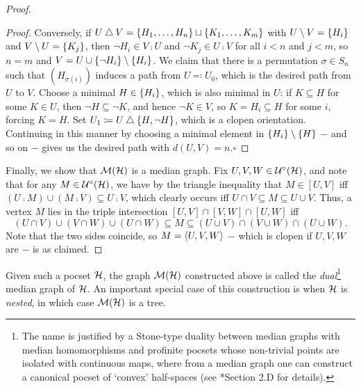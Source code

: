 \documentclass[reqno]{amsart}
\begin{document}
\begin{proof}
\begin{center}
\begin{minipage}{0.95\textwidth}
\begin{proof}
                    \hspace{0.2in}Conversely, if $U\bigtriangleup V=\left\{H_1,\dots,H_n\right\}\sqcup\left\{K_1,\dots,K_m\right\}$ with $U\setminus V=\left\{H_i\right\}$ and $V\setminus U=\left\{K_j\right\}$, then $\lnot H_i\in V\comp U$ and $\lnot K_j\in U\comp V$ for all $i<n$ and $j<m$, so $n=m$ and $V=U\cup\left\{\lnot H_i\right\}\setminus\left\{H_i\right\}$. We claim that there is a permutation $\sigma\in S_n$ such that $(H_{\sigma(i)})$ induces a path from $U\eqqcolon U_0$, which is the desired path from $U$ to $V$. Choose a minimal $H\in\left\{H_i\right\}$, which is also minimal in $U$: if $K\subseteq H$ for some $K\in U$, then $\lnot H\subseteq\lnot K$, and hence $\lnot K\in V$, so $K=H_i\subseteq H$ for some $i$, forcing $K=H$. Set $U_1\coloneqq U\bigtriangleup\left\{H,\lnot H\right\}$, which is a clopen orientation. Continuing in this manner by choosing a minimal element in $\left\{H_i\right\}\setminus\left\{H\right\}$ $-$ and so on $-$ gives us the desired path with $d(U,V)=n$.\phantom\qedhere\hfill$\square$
                \end{proof}
            \end{minipage}
        \end{center}
        Finally, we show that $\mathcal{M}(\mathcal{H})$ is a median graph. Fix $U,V,W\in\mathcal{U}^\circ(\mathcal{H})$, and note that for any $M\in\mathcal{U}^\circ(\mathcal{H})$, we have by the triangle inequality that $M\in[U,V]$ iff $(U\comp M)\cup(M\comp V)\subseteq U\comp V$, which clearly occurs iff $U\cap V\subseteq M\subseteq U\cup V$. Thus, a vertex $M$ lies in the triple intersection $[U,V]\cap[V,W]\cap[U,W]$ iff
        \begin{equation*}
            (U\cap V)\cup(V\cap W)\cup(U\cap W)\subseteq M\subseteq(U\cup V)\cap(V\cup W)\cap(U\cup W).
        \end{equation*}
        Note that the two sides coincide, so $M=\left\langle U,V,W\right\rangle$ $-$ which is clopen if $U,V,W$ are $-$ is as claimed.
    \end{proof}

    Given such a pocset $\mathcal{H}$, the graph $\mathcal{M}(\mathcal{H})$ constructed above is called the \textit{dual}\footnote{The name is justified by a Stone-type duality between median graphs with median homomorphisms and profinite pocsets whose non-trivial points are isolated with continuous maps, where from a median graph one can construct a canonical pocset of `convex' half-spaces (see \cite{CPTT23}*{Section 2.D} for details).} median graph of $\mathcal{H}$. An important special case of this construction is when $\mathcal{H}$ is \textit{nested}, in which case $\mathcal{M}(\mathcal{H})$ is a tree.
\end{document}
